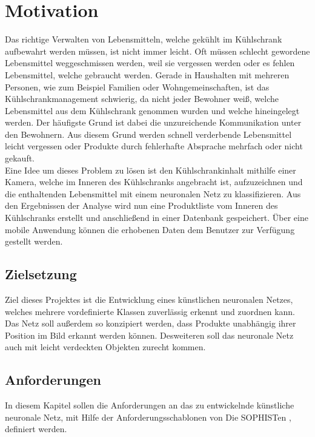 \documentclass[a4paper,12pt,oneside]{article}
\begin{document}
  \newpage
  
  \tableofcontents
  \newpage
  \listoffigures
 
  
  \newpage
  \pagestyle{plain}
  \setcounter{page}{1}
   
  
\section{Motivation}
Das richtige Verwalten von Lebensmitteln, welche gekühlt im Kühlschrank aufbewahrt werden müssen, ist nicht immer leicht. Oft müssen schlecht gewordene Lebensmittel weggeschmissen werden, weil sie vergessen werden oder es fehlen Lebensmittel, welche gebraucht werden. Gerade in Haushalten mit mehreren Personen, wie zum Beispiel Familien oder Wohngemeinschaften, ist das Kühlschrankmanagement schwierig, da nicht jeder Bewohner weiß, welche Lebensmittel aus dem Kühlschrank genommen wurden und welche hineingelegt werden. Der häufigste Grund ist dabei die unzureichende Kommunikation unter den Bewohnern. Aus diesem Grund werden schnell verderbende Lebensmittel leicht vergessen oder Produkte durch fehlerhafte Absprache mehrfach oder nicht gekauft. \\ Eine Idee um dieses Problem zu lösen ist den Kühlschrankinhalt mithilfe einer Kamera, welche im Inneren des Kühlschranks angebracht ist, aufzuzeichnen und die enthaltenden Lebensmittel mit einem neuronalen Netz zu klassifizieren. Aus den Ergebnissen der Analyse wird nun eine Produktliste vom Inneren des Kühlschranks erstellt und anschließend in einer Datenbank gespeichert. Über eine mobile Anwendung können die erhobenen Daten dem Benutzer zur Verfügung gestellt werden.
  
\subsection{Zielsetzung} 
Ziel dieses Projektes ist die Entwicklung eines künstlichen neuronalen Netzes, welches mehrere vordefinierte Klassen zuverlässig erkennt und zuordnen kann. Das Netz soll außerdem so konzipiert werden, dass Produkte unabhängig ihrer Position im Bild erkannt werden können. Desweiteren soll das neuronale Netz auch mit leicht verdeckten Objekten zurecht kommen.

\newpage
	
\subsection{Anforderungen}
In diesem Kapitel sollen die Anforderungen an das zu entwickelnde künstliche neuronale Netz, mit Hilfe der Anforderungsschablonen von \glqq Die SOPHISTen\grqq{} \cite{sophisten2013schablonen}, definiert werden. 
  
\end{document}
